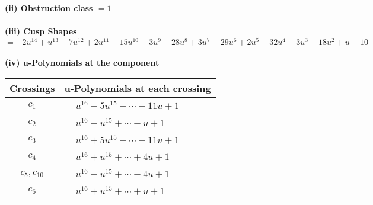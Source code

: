 \documentclass[1p]{elsarticle_modified}
\theoremstyle{definition}
\begin{document}
\flushleft \textbf{(ii) Obstruction class $= 1$}\\~\\
\flushleft \textbf{(iii) Cusp Shapes $= -2 u^{14}+u^{13}-7 u^{12}+2 u^{11}-15 u^{10}+3 u^9-28 u^8+3 u^7-29 u^6+2 u^5-32 u^4+3 u^3-18 u^2+u-10$}\\~\\
\newpage\renewcommand{\arraystretch}{1}
\flushleft \textbf{(iv) u-Polynomials at the component}\newline \\
\begin{tabular}{m{50pt}|m{274pt}}
Crossings & \hspace{64pt}u-Polynomials at each crossing \\
\hline $$\begin{aligned}c_{1}\end{aligned}$$&$\begin{aligned}
&u^{16}-5 u^{15}+\cdots-11 u+1
\end{aligned}$\\
\hline $$\begin{aligned}c_{2}\end{aligned}$$&$\begin{aligned}
&u^{16}- u^{15}+\cdots- u+1
\end{aligned}$\\
\hline $$\begin{aligned}c_{3}\end{aligned}$$&$\begin{aligned}
&u^{16}+5 u^{15}+\cdots+11 u+1
\end{aligned}$\\
\hline $$\begin{aligned}c_{4}\end{aligned}$$&$\begin{aligned}
&u^{16}+u^{15}+\cdots+4 u+1
\end{aligned}$\\
\hline $$\begin{aligned}c_{5},c_{10}\end{aligned}$$&$\begin{aligned}
&u^{16}- u^{15}+\cdots-4 u+1
\end{aligned}$\\
\hline $$\begin{aligned}c_{6}\end{aligned}$$&$\begin{aligned}
&u^{16}+u^{15}+\cdots+u+1
\end{aligned}$\\

\end{tabular}
\end{document}
